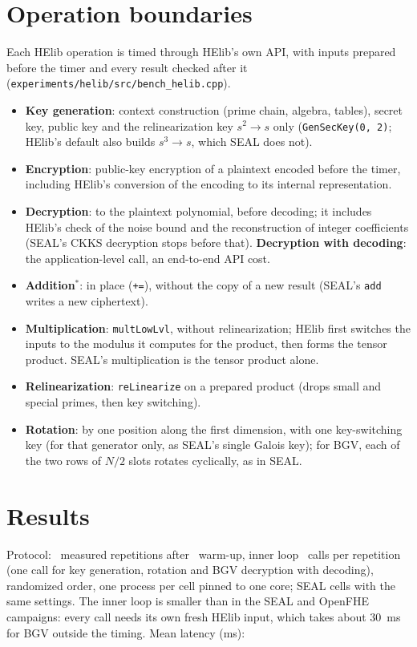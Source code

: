 \documentclass[11pt]{article}
\begin{document}
\section{Operation boundaries}

Each HElib operation is timed through HElib's own API, with inputs prepared before the timer and every result checked after it (\texttt{experiments/helib/src/bench\_helib.cpp}).
\begin{itemize}[leftmargin=*, itemsep=1pt]
  \item \textbf{Key generation}: context construction (prime chain, algebra, tables), secret key, public key and the relinearization key $s^2 \to s$ only (\texttt{GenSecKey(0, 2)}; HElib's default also builds $s^3 \to s$, which SEAL does not).
  \item \textbf{Encryption}: public-key encryption of a plaintext encoded before the timer, including HElib's conversion of the encoding to its internal representation.
  \item \textbf{Decryption}: to the plaintext polynomial, before decoding; it includes HElib's check of the noise bound and the reconstruction of integer coefficients (SEAL's CKKS decryption stops before that). \textbf{Decryption with decoding}: the application-level call, an end-to-end API cost.
  \item \textbf{Addition}$^\ast$: in place (\texttt{+=}), without the copy of a new result (SEAL's \texttt{add} writes a new ciphertext).
  \item \textbf{Multiplication}: \texttt{multLowLvl}, without relinearization; HElib first switches the inputs to the modulus it computes for the product, then forms the tensor product. SEAL's multiplication is the tensor product alone.
  \item \textbf{Relinearization}: \texttt{reLinearize} on a prepared product (drops small and special primes, then key switching).
  \item \textbf{Rotation}: by one position along the first dimension, with one key-switching key (for that generator only, as SEAL's single Galois key); for BGV, each of the two rows of $N/2$ slots rotates cyclically, as in SEAL.
\end{itemize}

\section{Results}

Protocol: \hlReps\ measured repetitions after \hlWarm\ warm-up, inner loop \hlInner\ calls per repetition (one call for key generation, rotation and BGV decryption with decoding), randomized order, one process per cell pinned to one core; SEAL cells with the same settings. The inner loop is smaller than in the SEAL and OpenFHE campaigns: every call needs its own fresh HElib input, which takes about 30~ms for BGV outside the timing. Mean latency (ms):
\end{document}
